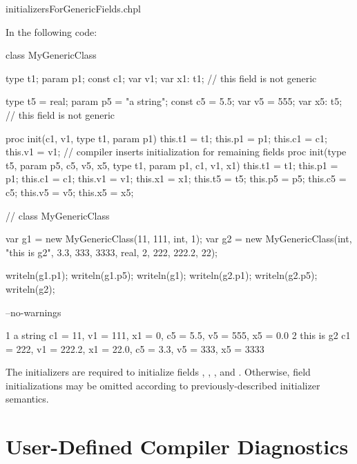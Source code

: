 \begin{chapelexample}{initializersForGenericFields.chpl}


In the following code:
\begin{chapel}
class MyGenericClass {
  type t1;
  param p1;
  const c1;
  var v1;
  var x1: t1; // this field is not generic

  type t5 = real;
  param p5 = "a string";
  const c5 = 5.5;
  var v5 = 555;
  var x5: t5; // this field is not generic

  proc init(c1, v1, type t1, param p1) {
    this.t1 = t1;
    this.p1 = p1;
    this.c1 = c1;
    this.v1 = v1;
    // compiler inserts initialization for remaining fields
  }
  proc init(type t5, param p5, c5, v5, x5,
            type t1, param p1, c1, v1, x1) {
    this.t1 = t1;
    this.p1 = p1;
    this.c1 = c1;
    this.v1 = v1;
    this.x1 = x1;
    this.t5 = t5;
    this.p5 = p5;
    this.c5 = c5;
    this.v5 = v5;
    this.x5 = x5;
  }
}  // class MyGenericClass

var g1 = new MyGenericClass(11, 111, int, 1);
var g2 = new MyGenericClass(int, "this is g2", 3.3, 333, 3333,
                            real, 2, 222, 222.2, 22);
\end{chapel}
\begin{chapelpost}
writeln(g1.p1);
writeln(g1.p5);
writeln(g1);
writeln(g2.p1);
writeln(g2.p5);
writeln(g2);
\end{chapelpost}
\begin{chapelcompopts}
--no-warnings
\end{chapelcompopts}
\begin{chapeloutput}
1
a string
{c1 = 11, v1 = 111, x1 = 0, c5 = 5.5, v5 = 555, x5 = 0.0}
2
this is g2
{c1 = 222, v1 = 222.2, x1 = 22.0, c5 = 3.3, v5 = 333, x5 = 3333}
\end{chapeloutput}
The initializers are required to initialize fields , ,
, and . Otherwise, field initializations may be omitted
according to previously-described initializer semantics.
\end{chapelexample}

\pagebreak
\section{User-Defined Compiler Diagnostics}
\label{User_Defined_Compiler_Errors}

